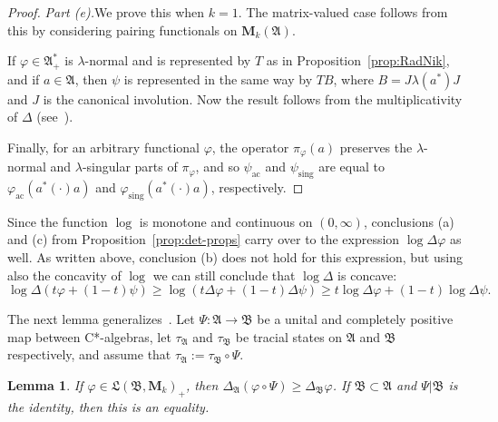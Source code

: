 \documentclass[12pt,a4paper]{article}
\numberwithin{equation}{section}
\newtheorem{lem}[thm]{Lemma}
\theoremstyle{remark}
\renewcommand{\rm}[1]{\mathrm{#1}}
\newcommand{\rmM}{\mathbf{M}}
\newcommand{\A}{\mathfrak{A}}
\newcommand{\B}{\mathfrak{B}}
\newcommand{\frL}{\mathfrak{L}}
\renewcommand{\phi}{\varphi}
\renewcommand{\l}{\lambda}
\begin{document}
\begin{proof}
\vspace{7pt}

\emph{Part (e).}\quad We prove this when $k=1$.  The matrix-valued case follows from this by considering pairing functionals on $\rmM_k(\A)$.

If $\phi \in \A_+^\ast$ is $\l$-normal and is represented by $T$ as in Proposition~\ref{prop:RadNik}, and if $a \in \A$, then $\psi$ is represented in the same way by $T B$, where $B = J\l(a^\ast)J$ and $J$ is the canonical involution.  Now the result follows from the multiplicativity of $\Delta$ (see~\cite[Prop. 2.5]{HaaSch07}).

Finally, for an arbitrary functional $\phi$, the operator $\pi_\phi(a)$ preserves the $\l$-normal and $\l$-singular parts of $\pi_\phi$, and so $\psi_{\rm{ac}}$ and $\psi_{\rm{sing}}$ are equal to $\phi_{\rm{ac}}(a^\ast(\cdot)a)$ and $\phi_{\rm{sing}}(a^\ast(\cdot)a)$, respectively.
\end{proof}

Since the function $\log$ is monotone and continuous on $(0,\infty)$, conclusions (a) and (c) from Proposition~\ref{prop:det-props} carry over to the expression $\log \Delta \phi$ as well.  As written above, conclusion (b) does not hold for this expression, but using also the concavity of $\log$ we can still conclude that $\log\Delta$ is concave:
\begin{equation}\label{eq:log-det-concave}
\log \Delta (t\phi + (1-t)\psi)  \ge \log(t\Delta \phi + (1-t)\Delta \psi) \ge t\log \Delta \phi + (1-t)\log \Delta \psi.
\end{equation}

The next lemma generalizes~\cite[Cor. 4.3.4]{Arv67}. Let $\Psi:\A \to \B$ be a unital and completely positive map between C*-algebras, let $\tau_\A$ and $\tau_\B$ be tracial states on $\A$ and $\B$ respectively, and assume that $\tau_\A := \tau_\B\circ \Psi$.

\begin{lem}\label{lem:det-ucp}
If $\phi \in \frL(\B,\rmM_k)_+$, then $\Delta_\A(\phi \circ \Psi) \ge \Delta_\B \phi$.  If $\B \subset \A$ and $\Psi|\B$ is the identity, then this is an equality.
\end{lem}
\end{document}
